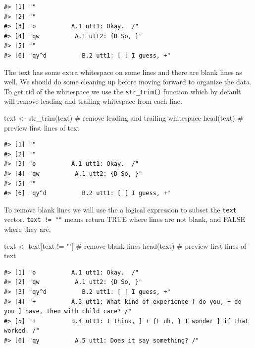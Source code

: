 \documentclass[
  letterpaper,
]{latex/krantz}
\newenvironment{Shaded}{\begin{snugshade}}{\end{snugshade}}
\newcommand{\CommentTok}[1]{\textcolor[rgb]{0.37,0.37,0.37}{#1}}
\newcommand{\FunctionTok}[1]{\textcolor[rgb]{0.28,0.35,0.67}{#1}}
\newcommand{\NormalTok}[1]{\textcolor[rgb]{0.00,0.23,0.31}{#1}}
\newcommand{\OtherTok}[1]{\textcolor[rgb]{0.00,0.23,0.31}{#1}}
\newcommand{\SpecialCharTok}[1]{\textcolor[rgb]{0.37,0.37,0.37}{#1}}
\newcommand{\StringTok}[1]{\textcolor[rgb]{0.13,0.47,0.30}{#1}}
\begin{document}
\begin{verbatim}
#> [1] ""                                      
#> [2] ""                                      
#> [3] "o          A.1 utt1: Okay.  /"         
#> [4] "qw          A.1 utt2: {D So, }"        
#> [5] ""                                      
#> [6] "qy^d          B.2 utt1: [ [ I guess, +"
\end{verbatim}

The text has some extra whitespace on some lines and there are blank
lines as well. We should do some cleaning up before moving forward to
organize the data. To get rid of the whitespace we use the
\texttt{str\_trim()} function which by default will remove leading and
trailing whitespace from each line.

\begin{Shaded}
\begin{Highlighting}[]
\NormalTok{text }\OtherTok{\textless{}{-}} \FunctionTok{str\_trim}\NormalTok{(text) }\CommentTok{\# remove leading and trailing whitespace}
\FunctionTok{head}\NormalTok{(text) }\CommentTok{\# preview first lines of \textasciigrave{}text\textasciigrave{}}
\end{Highlighting}
\end{Shaded}

\begin{verbatim}
#> [1] ""                                      
#> [2] ""                                      
#> [3] "o          A.1 utt1: Okay.  /"         
#> [4] "qw          A.1 utt2: {D So, }"        
#> [5] ""                                      
#> [6] "qy^d          B.2 utt1: [ [ I guess, +"
\end{verbatim}

To remove blank lines we will use the a logical expression to subset the
\texttt{text} vector. \texttt{text\ !=\ ""} means return TRUE where
lines are not blank, and FALSE where they are.

\begin{Shaded}
\begin{Highlighting}[]
\NormalTok{text }\OtherTok{\textless{}{-}}\NormalTok{ text[text }\SpecialCharTok{!=} \StringTok{""}\NormalTok{] }\CommentTok{\# remove blank lines}
\FunctionTok{head}\NormalTok{(text) }\CommentTok{\# preview first lines of \textasciigrave{}text\textasciigrave{}}
\end{Highlighting}
\end{Shaded}

\begin{verbatim}
#> [1] "o          A.1 utt1: Okay.  /"                                                                  
#> [2] "qw          A.1 utt2: {D So, }"                                                                 
#> [3] "qy^d          B.2 utt1: [ [ I guess, +"                                                         
#> [4] "+          A.3 utt1: What kind of experience [ do you, + do you ] have, then with child care? /"
#> [5] "+          B.4 utt1: I think, ] + {F uh, } I wonder ] if that worked. /"                        
#> [6] "qy          A.5 utt1: Does it say something? /"
\end{verbatim}
\end{document}
